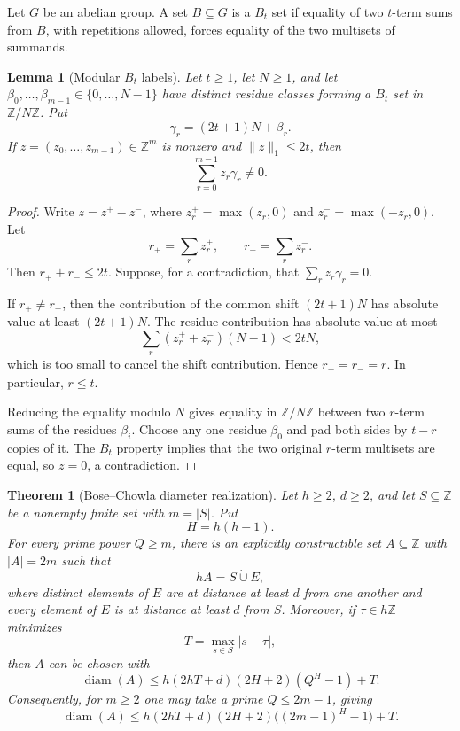 \documentclass[11pt]{article}
\newtheorem{theorem}{Theorem}
\newtheorem{lemma}{Lemma}
\newcommand{\Z}{\mathbb{Z}}
\begin{document}
Let $G$ be an abelian group. A set $B\subseteq G$ is a $B_t$ set if equality
of two $t$-term sums from $B$, with repetitions allowed, forces equality of
the two multisets of summands.

\begin{lemma}[Modular $B_t$ labels]\label{lem:modular-bt-labels}
Let $t\geq 1$, let $N\geq 1$, and let
$\beta_0,\ldots,\beta_{m-1}\in\{0,\ldots,N-1\}$ have distinct residue
classes forming a $B_t$ set in $\Z/N\Z$. Put
\[
 \gamma_r=(2t+1)N+\beta_r.
\]
If $z=(z_0,\ldots,z_{m-1})\in\Z^m$ is nonzero and
$\lVert z\rVert_1\leq 2t$, then
\[
 \sum_{r=0}^{m-1}z_r\gamma_r\neq 0.
\]
\end{lemma}

\begin{proof}
Write $z=z^+-z^-$, where $z_r^+=\max(z_r,0)$ and
$z_r^-=\max(-z_r,0)$. Let
\[
 r_+=\sum_r z_r^+,
 \qquad
 r_-=\sum_r z_r^-.
\]
Then $r_++r_-\leq 2t$. Suppose, for a contradiction, that
$\sum_rz_r\gamma_r=0$.

If $r_+\neq r_-$, then the contribution of the common shift $(2t+1)N$ has
absolute value at least $(2t+1)N$. The residue contribution has absolute
value at most
\[
 \sum_r(z_r^++z_r^-)(N-1)<2tN,
\]
which is too small to cancel the shift contribution. Hence $r_+=r_-=r$.
In particular, $r\leq t$.

Reducing the equality modulo $N$ gives equality in $\Z/N\Z$ between two
$r$-term sums of the residues $\beta_i$. Choose any one residue $\beta_0$
and pad both sides by $t-r$ copies of it. The $B_t$ property implies that
the two original $r$-term multisets are equal, so $z=0$, a contradiction.
\end{proof}

\begin{theorem}[Bose--Chowla diameter realization]\label{thm:bose-chowla}
Let $h\geq 2$, $d\geq 2$, and let $S\subseteq\Z$ be a nonempty finite set
with $m=|S|$. Put
\[
 H=h(h-1).
\]
For every prime power $Q\geq m$, there is an explicitly constructible set
$A\subseteq\Z$ with $|A|=2m$ such that
\[
 hA=S\mathbin{\dot\cup}E,
\]
where distinct elements of $E$ are at distance at least $d$ from one another
and every element of $E$ is at distance at least $d$ from $S$. Moreover, if
$\tau\in h\Z$ minimizes
\[
 T=\max_{s\in S}|s-\tau|,
\]
then $A$ can be chosen with
\[
 \operatorname{diam}(A)
 \leq h(2hT+d)(2H+2)(Q^H-1)+T.
\]
Consequently, for $m\geq 2$ one may take a prime $Q\leq 2m-1$, giving
\[
 \operatorname{diam}(A)
 \leq h(2hT+d)(2H+2)\bigl((2m-1)^H-1\bigr)+T.
\]
\end{theorem}
\end{document}
